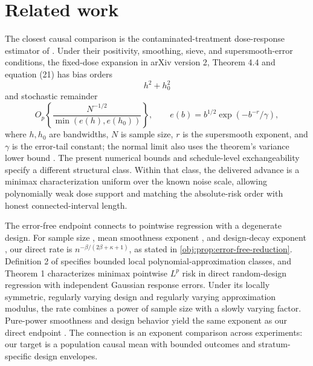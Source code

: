 \section{Related work}

The closest causal comparison is the contaminated-treatment dose-response estimator of \citet{HuangZhang2023}. Under their positivity, smoothing, sieve, and supersmooth-error conditions, the fixed-dose expansion in arXiv version 2, Theorem 4.4 and equation (21) has bias orders
\[
h^2+h_0^2
\]
and stochastic remainder
\[
O_p\!\left\{\frac{N^{-1/2}}{\min(e(h),e(h_0))}\right\},
\qquad
e(b)=b^{1/2}\exp(-b^{-r}/\gamma),
\]
where \(h,h_0\) are bandwidths, \(N\) is sample size, \(r\) is the supersmooth exponent, and \(\gamma\) is the error-tail constant; the normal limit also uses the theorem's variance lower bound \citep[arXiv version 2, Theorem 4.4, equation (21)]{HuangZhang2023}. The present numerical bounds and schedule-level exchangeability specify a different structural class. Within that class, the delivered advance is a minimax characterization uniform over the known noise scale, allowing polynomially weak dose support and matching the absolute-risk order with honest connected-interval length.

The error-free endpoint connects to pointwise regression with a degenerate design. For sample size , mean smoothness exponent \leanref{sym:beta(smoothness exponent in (0,1])}{\ensuremath{\beta}}, and design-decay exponent , our direct rate is \(n^{-\beta/(2\beta+\kappa+1)}\), as stated in \cref{obj:prop:error-free-reduction}. Definition 2 of \citet{Gaiffas2005} specifies bounded local polynomial-approximation classes, and Theorem 1 characterizes minimax pointwise \(L^p\) risk in direct random-design regression with independent Gaussian response errors. Under its locally symmetric, regularly varying design and regularly varying approximation modulus, the rate combines a power of sample size with a slowly varying factor. Pure-power smoothness and design behavior yield the same exponent as our direct endpoint \citep[Definition 2 and Theorem 1]{Gaiffas2005}. The connection is an exponent comparison across experiments: our target is a population causal mean with bounded outcomes and stratum-specific design envelopes.


